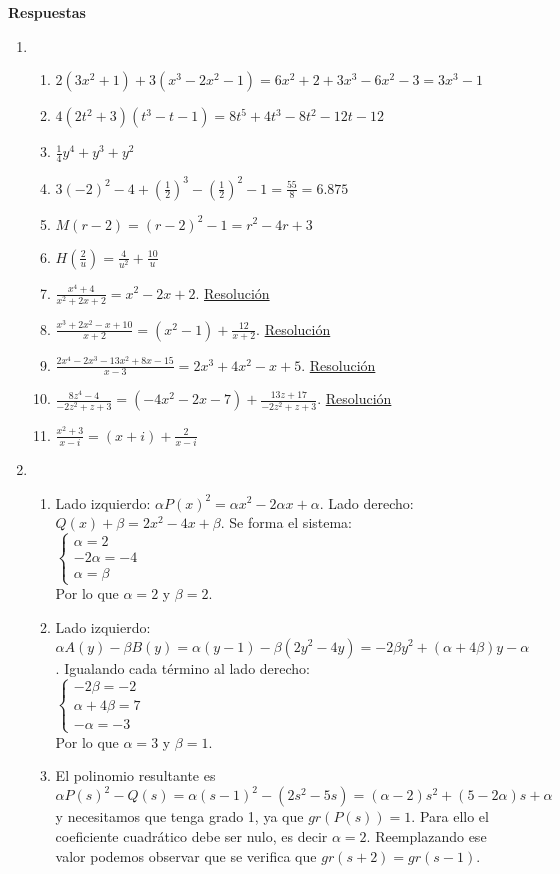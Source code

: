 \documentclass[a4paper]{article}
\newcommand{\exercise}{\item}
\newcommand{\SEL}[1]{\left\{\begin{matrix} #1 \end{matrix}\right.}
\newcommand{\df}[2]{\displaystyle\frac{#1}{#2}}
\begin{document}
\vspace{20pt} 
 \textbf{Respuestas}\begin{enumerate}\exercise\begin{enumerate} [label=(\alph*)]		\item $2(3x^2+1)+3(x^3-2x^2-1)=6x^2+2+3x^3-6x^2-3=3x^3-1$
		\item $4(2t^2+3)(t^3-t-1)=8t^5+4t^3-8t^2-12t-12$ 
		\item $\df{1}{4}y^4+y^3+y^2$
		\item $3(-2)^2-4+\left(\df{1}{2}\right)^3-\left(\df{1}{2}\right)^2-1=\df{55}{8} = 6.875$
		\item $M(r-2)=(r-2)^2-1=r^2-4r+3$
		\item $H\left(\df{2}{u}\right)=\df{4}{u^2}+\df{10}{u}$
		\item $\df{x^4+4}{x^2+2x+2}=x^2-2x+2$. \href{https://youtu.be/DWDi7BKAKbc}{Resolución}
		\item $\df{x^3+2x^2-x+10}{x+2}=(x^2-1)+\df{12}{x+2}$. \href{https://youtu.be/bfCWsvZfFq0}{Resolución}
		\item $\df{2x^4-2x^3-13x^2+8x-15}{x-3}=2x^3+4x^2-x+5$. \href{https://youtu.be/W3HcTD4IC94}{Resolución}
		\item $\df{8z^4-4}{-2z^2+z+3}=(-4x^2-2x-7)+\df{13z+17}{-2z^2+z+3}$. \href{https://youtu.be/0Dw3MAwrA34}{Resolución}
		\item $\df{x^2+3}{x-i}=(x+i)+\df{2}{x-i}$
\end{enumerate}\exercise\begin{enumerate} [label=(\alph*)]		\item Lado izquierdo: $\alpha P(x)^2= \alpha x^2-2 \alpha x+ \alpha$. Lado derecho: $Q(x) +\beta= 2x^2-4x+\beta$. Se forma el sistema: \\ $\SEL{\alpha=2 \\ -2\alpha = -4 \\ \alpha= \beta}$ \\ Por lo que $\alpha=2$ y $\beta=2$.
		\item Lado izquierdo: $\alpha A(y)-\beta B(y) = \alpha (y-1)- \beta (2y^2-4y)= -2\beta y^2 + (\alpha+4\beta) y - \alpha$. Igualando cada término al lado derecho: \\  $\SEL{-2\beta =-2 \\ \alpha+4\beta=7 \\ -\alpha=-3}$ \\ Por lo que $\alpha=3$ y $\beta=1$.
		\item El polinomio resultante es $\alpha P(s)^2 - Q(s)= \alpha (s-1)^2 - (2s^2-5s)= (\alpha-2) s^2 + (5-2\alpha) s + \alpha$ y necesitamos que tenga grado 1, ya que $gr\left(P(s)\right)=1$. Para ello el coeficiente cuadrático debe ser nulo, es decir $\alpha=2$. Reemplazando ese valor podemos observar que se verifica que $gr(s+2)=gr(s-1)$.

\end{enumerate}
\end{enumerate}
\end{document}
